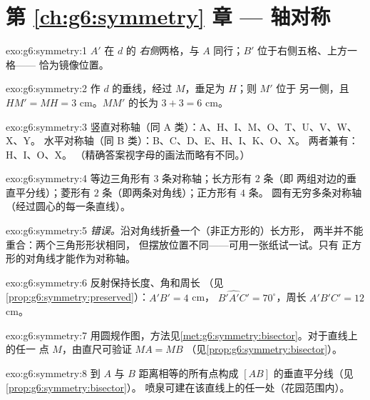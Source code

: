\section*{第 \ref{ch:g6:symmetry} 章 --- 轴对称}

\begin{solution}{exo:g6:symmetry:1}
$A'$ 在 $d$ 的 \emph{右侧}两格，与
$A$ 同行；$B'$ 位于右侧五格、上方一格——
恰为镜像位置。
\end{solution}

\begin{solution}{exo:g6:symmetry:2}
作 $d$ 的垂线，经过 $M$，垂足为 $H$；则 $M'$ 位于
另一侧，且 $HM' = MH = 3$ cm。$MM'$ 的长为
$3 + 3 = 6$ cm。
\end{solution}

\begin{solution}{exo:g6:symmetry:3}
竖直对称轴（同 A 类）：A、H、I、M、O、T、U、V、W、X、Y。
水平对称轴（同 B 类）：B、C、D、E、H、I、K、O、X。
两者兼有：H、I、O、X。
（精确答案视字母的画法而略有不同。）
\end{solution}

\begin{solution}{exo:g6:symmetry:4}
等边三角形有 $3$ 条对称轴；长方形有 $2$ 条（即
两组对边的垂直平分线）；菱形有 $2$ 条（即两条对角线）；正方形有 $4$ 条。
圆有无穷多条对称轴（经过圆心的每一条直线）。
\end{solution}

\begin{solution}{exo:g6:symmetry:5}
\emph{错误。}沿对角线折叠一个（非正方形的）长方形，
两半并不能重合：两个三角形形状相同，
但摆放位置不同——可用一张纸试一试。只有
正方形的对角线才能作为对称轴。
\end{solution}

\begin{solution}{exo:g6:symmetry:6}
反射保持长度、角和周长
（见\cref{prop:g6:symmetry:preserved}）：$A'B' = 4$ cm，
$\widehat{B'A'C'} = 70^\circ$，周长 $A'B'C' = 12$ cm。
\end{solution}

\begin{solution}{exo:g6:symmetry:7}
用圆规作图，方法见\cref{met:g6:symmetry:bisector}。对于直线上的任一
点 $M$，由直尺可验证 $MA = MB$
（见\cref{prop:g6:symmetry:bisector}）。
\end{solution}

\begin{solution}{exo:g6:symmetry:8}
到 $A$ 与 $B$ 距离相等的所有点构成
$[AB]$ 的垂直平分线（见\cref{prop:g6:symmetry:bisector}）。
喷泉可建在该直线上的任一处（花园范围内）。
\end{solution}

